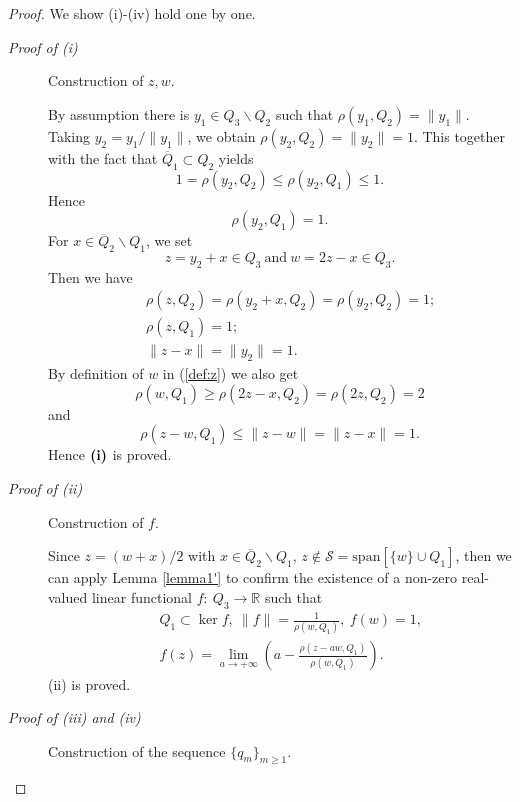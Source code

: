 \documentclass[12pt, reqno]{amsart}
\theoremstyle{definition}
\theoremstyle{remark}
\numberwithin{equation}{section}
\begin{document}
\begin{proof} We show (i)-(iv) hold one by one.
  \begin{description}
  \item[\emph{Proof of (i)}] Construction of $z,w$.

By assumption there is $y_1\in Q_3\backslash  Q_2$ such that $\rho(y_1,Q_2)=\|y_1\|$. Taking $y_2=y_1/\|y_1\|$, we obtain $\rho(y_2,Q_2)=\|y_2\|=1$. This together with the fact that $\overline Q_1\subset Q_2$ yields
$$
1=\rho(y_2,Q_2)\le\rho(y_2,Q_1)\le1.
$$
Hence
$$
\rho(y_2,Q_1)=1.
$$
For $x\in\overline Q_2\backslash Q_1$, we set
\begin{equation}
    \label{def:z}
    z=y_2+x\in Q_3~\mbox{and}~w=2z- x\in Q_3.
\end{equation}
Then we have
 \begin{eqnarray}
 \label{zQ}
 &&\rho(z,Q_2)=\rho(y_2+ x,Q_2)=\rho(y_2,Q_2)=1;\nonumber\\
 &&\rho(z,Q_1)=1;\nonumber\\
 &&\|z- x\|=\|y_2\|=1.
 \end{eqnarray}
 By definition of $w$ in (\ref{def:z}) we also get
 \begin{equation}
 \label{z-wQ1}
 \rho(w,Q_1)\ge \rho(2z-x,Q_2)= \rho(2z,Q_2)=2
 \end{equation}
 and
 \begin{equation}
 \label{z-wQ2}
 \rho(z-w,Q_1)\le \|z-w\|=\|z-x\|=1.
 \end{equation}
Hence $\emph{\bf{(i)}}$ is proved.
\item[\emph{Proof of (ii)}] Construction of $f$.

Since $z=(w+x)/2$ with $x\in \overline Q_2\backslash Q_1$, $z\notin \mathcal S= \mbox{span}[\{w\}\cup Q_1]$, then we can apply Lemma \ref{lemma1'} to confirm the existence of  a non-zero real-valued linear functional $f:~Q_3\rightarrow \mathbb R$ such that
\begin{eqnarray}
\label{f1}
&&Q_1\subset \ker f,~\|f\|=\frac{1}{\rho(w,Q_1)},~f(w)=1,\nonumber\\
&&f(z)=\lim_{a\to+\infty}\left(a-\frac{\rho(z-a w,Q_1)}{\rho(w,Q_1)}\right).
\end{eqnarray}
(ii) is proved.
\item[\emph{Proof of (iii) and (iv)}] Construction of the sequence $\{q_m\}_{m\ge1}$.



\end{description}
\end{proof}
\end{document}
